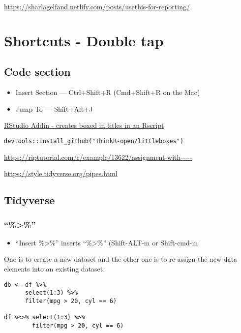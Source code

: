 \documentclass[]{book}
\providecommand{\tightlist}{%
  \setlength{\itemsep}{0pt}\setlength{\parskip}{0pt}}
\begin{document}
\url{https://sharlagelfand.netlify.com/posts/usethis-for-reporting/}

\hypertarget{shortcuts---double-tap}{%
\chapter{Shortcuts - Double tap}\label{shortcuts---double-tap}}

\hypertarget{code-section}{%
\section{Code section}\label{code-section}}

\begin{itemize}
\tightlist
\item
  Insert Section --- Ctrl+Shift+R (Cmd+Shift+R on the Mac)
\item
  Jump To --- Shift+Alt+J
\end{itemize}

\href{https://github.com/ThinkR-open/littleboxes}{RStudio Addin - creates boxed in titles in an Rscript}

\begin{verbatim}
devtools::install_github("ThinkR-open/littleboxes")
\end{verbatim}

\url{https://riptutorial.com/r/example/13622/assignment-with-----}

\url{https://style.tidyverse.org/pipes.html}

\hypertarget{tidyverse}{%
\section{Tidyverse}\label{tidyverse}}

\hypertarget{section}{%
\subsection{``\%\textgreater{}\%''}\label{section}}

\begin{itemize}
\tightlist
\item
  ``Insert \%\textgreater{}\%'' inserts ``\%\textgreater{}\%'' (Shift-ALT-m or Shift-cmd-m
\end{itemize}

One is to create a new dataset and the other one is to re-assign the new data elements into an existing dataset.

\begin{verbatim}
db <- df %>% 
      select(1:3) %>% 
      filter(mpg > 20, cyl == 6)

df %<>% select(1:3) %>%
        filter(mpg > 20, cyl == 6)
\end{verbatim}
\end{document}
